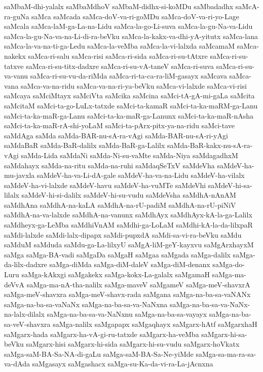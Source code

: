{saMbaM-dhi-yalalx
saMbaMdhoV
saMbaM-didhx-si-koMDu
saMbadadhx
saMcA-ra-guNa
saMca
saMcada
saMca-doV-va-ri-goMDu
saMca-doV-va-ri-yo-Lage
saMcala
saMca-laM-ga-La-na-Lidu
saMca-la-go-Li-suva
saMca-la-gu-Na-va-Lidu
saMca-la-gu-Na-va-na-Li-di-ra-beVku
saMca-la-kakx-va-dhi-yA-yitutx
saMca-lana
saMca-la-va-na-ti-ga-Ledu
saMca-la-veMba
saMca-la-vi-lalxda
saMcamaM
saMca-nakekx
saMca-ri-salu
saMca-risi
saMca-ri-sida
saMca-ri-su-tAtxre
saMca-ri-su-tatxve
saMca-ri-su-titx-dadxre
saMca-ri-su-vA-taneV
saMca-ri-suva
saMca-ri-su-va-vanu
saMca-ri-su-vu-da-riMda
saMca-ri-ta-ca-ra-liM-gasayx
saMcava
saMca-vana
saMca-va-na-ridu
saMca-va-na-ri-ya-beVku
saMca-vi-lalxde
saMca-vi-risi
saMcaya
saMciMtayx
saMciVta
saMcika
saMcina
saMci-tA-gA-mi-gaLa
saMcita
saMcitaM
saMci-ta-go-LuLx-tatxde
saMci-ta-kamaR
saMci-ta-ka-maRM-ga-Lanu
saMci-ta-ka-maR-ga-Lanu
saMci-ta-ka-maR-ga-Lanunx
saMci-ta-ka-maR-nAsha
saMci-ta-ka-maR-rA-shi-yoLaM
saMci-ta-pArx-pitx-ya-na-ridu
saMci-tave
saMdAga
saMda
saMda-BAR-nu-sA-ra-vAgi
saMda-BAR-nu-sA-ri-yAgi
saMdaBaR
saMda-BaR-dalilx
saMda-BaR-ga-Lalilx
saMda-BaR-kakx-nu-sA-ra-vAgi
saMda-Lida
saMdaNi
saMda-Ni-su-vaMte
saMda-Niya
saMdagadhxM
saMdahayx
saMda-na-ritu
saMda-na-ruhi
saMdaqSeTxV
saMdeVha
saMdeV-ha-mu-javxla
saMdeV-ha-va-Li-dA-gale
saMdeV-ha-va-na-Lidu
saMdeV-ha-vilalx
saMdeV-ha-vi-lalxde
saMdeV-havu
saMdeV-ha-vuMTe
saMdeVhi
saMdeV-hi-sa-lilalx
saMdeV-hi-si-dalilx
saMdeV-hi-su-vudu
saMdeVsha
saMdhA-nAnAM
saMdhAna
saMdhA-na-kaLA
saMdhA-na-rU-padiM
saMdhA-na-rU-piNiV
saMdhA-na-va-lalxde
saMdhA-na-vanunx
saMdhAyx
saMdhAyx-kA-la-ga-Lalilx
saMdheyx-ga-LeMba
saMdhiVnAM
saMdhi-ga-LoLaM
saMdhi-kA-la-da-lilxpaR
saMdi-lalxde
saMdi-lalx-dipapx
saMdi-pupxdA
saMdi-sa-vi-ra-beVku
saMdu
saMduM
saMduda
saMdu-ga-La-lilxyU
saMgA-liM-geY-kayxvu
saMgArxhayxM
saMga
saMga-BA-vadi
saMgaDa
saMgaH
saMgaa
saMgada
saMga-dalilx
saMga-da-lilx-dadxre
saMga-diMda
saMga-diM-daleV
saMga-diM-denanx
saMga-do-Luru
saMga-kAkxgi
saMgakekx
saMga-kokx-La-galalx
saMgamaH
saMga-ma-deVvA
saMga-ma-nA-tha-nalilx
saMga-maveV
saMgameV
saMga-meV-shavxrA
saMga-meV-shavxra
saMga-meV-shavx-rada
saMgana
saMga-na-ba-sa-vaNANx
saMga-na-ba-sa-vaNaNx
saMga-na-ba-sa-va-NaNxna
saMga-na-ba-sa-va-NaNx-na-lalx-dilalx
saMga-na-ba-sa-va-NaNxnu
saMga-na-ba-sa-vayayx
saMga-na-ba-sa-veV-shavxra
saMga-nalilx
saMgapapx
saMgaqhayx
saMgarx-hAtf
saMgarxhaH
saMgarx-hada
saMgarx-ha-vA-gi-ru-tatxde
saMgarx-ha-veMba
saMgarx-hi-sa-beVku
saMgarx-hisi
saMgarx-hi-sida
saMgarx-hi-su-vudu
saMgarx-hoVkatx
saMga-saM-BA-Sa-NA-di-gaLu
saMga-saM-BA-Sa-Ne-yiMde
saMga-sa-ma-ra-sa-va-dAda
saMgasayx
saMgashacx
saMga-su-Ka-da-vi-ra-La-jAcnxna
}
